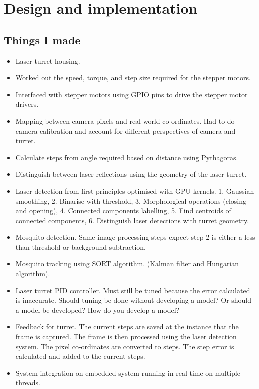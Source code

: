 
\section{Design and implementation}

\subsection{Things I made}
\begin{itemize}
    \item Laser turret housing.
    \item Worked out the speed, torque, and step size required for the stepper motors.
    \item Interfaced with stepper motors using GPIO pins to drive the stepper motor drivers.
    \item Mapping between camera pixels and real-world co-ordinates. Had to do camera calibration and account for different perspectives of camera and turret.
    \item Calculate steps from angle required based on distance using Pythagoras.
    \item Distinguish between laser reflections using the geometry of the laser turret.
    \item Laser detection from first principles optimised with GPU kernels. 1. Gaussian smoothing, 2. Binarise with threshold, 3. Morphological operations (closing and opening), 4. Connected components labelling, 5. Find centroids of connected components, 6. Distinguish laser detections with turret geometry.
    \item Mosquito detection. Same image processing steps expect step 2 is either a less than threshold or background subtraction.
    \item Mosquito tracking using SORT algorithm. (Kalman filter and Hungarian algorithm).
    \item Laser turret PID controller. Must still be tuned because the error calculated is inaccurate. Should tuning be done without developing a model? Or should a model be developed? How do you develop a model?
    \item Feedback for turret. The current steps are saved at the instance that the frame is captured. The frame is then processed using the laser detection system. The pixel co-ordinates are converted to steps. The step error is calculated and added to the current steps.
    \item System integration on embedded system running in real-time on multiple threads.
\end{itemize}


